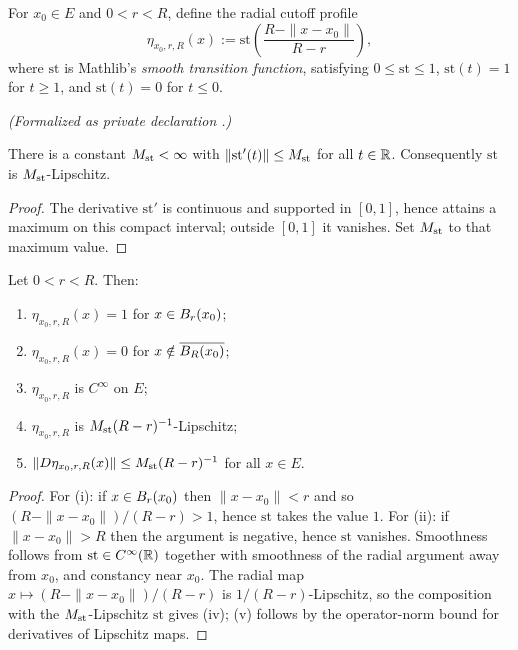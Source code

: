 \begin{definition}
\label{def:myCutoff}
\leanok
For $x_0 \in E$ and $0 < r < R$, define the radial cutoff profile
\begin{equation*}
\eta_{x_0,r,R}(x) := \mathrm{st}\!\left(\frac{R - \|x - x_0\|}{R - r}\right),
\end{equation*}
where $\mathrm{st}$ is Mathlib's \emph{smooth transition function}, satisfying
$0 \le \mathrm{st} \le 1$, $\mathrm{st}(t) = 1$ for $t \ge 1$, and
$\mathrm{st}(t) = 0$ for $t \le 0$.
\end{definition}

\begin{lemma}
\label{lem:smoothTransition_nnnorm_deriv_bounded}
\leanok
\noindent\textit{(Formalized as private declaration .)}\par
There is a constant $M_{\mathrm{st}} < \infty$ with $\|\mathrm{st}'(t)\| \le M_{\mathrm{st}}$ for
all $t \in \mathbb{R}$. Consequently $\mathrm{st}$ is $M_{\mathrm{st}}$-Lipschitz.
\end{lemma}

\begin{proof}
\leanok

The derivative $\mathrm{st}'$ is continuous and supported in $[0,1]$, hence
attains a maximum on this compact interval; outside $[0,1]$ it vanishes. Set
$M_{\mathrm{st}}$ to that maximum value.
\end{proof}

\begin{lemma}
\label{lem:cutoff-properties}
\leanok
{}
Let $0 < r < R$. Then:
\begin{enumerate}
\item $\eta_{x_0,r,R}(x) = 1$ for $x \in B_{r}(x_0)$;
\item $\eta_{x_0,r,R}(x) = 0$ for $x \notin \overline{B_{R}(x_0)}$;
\item $\eta_{x_0,r,R}$ is $C^\infty$ on $E$;
\item $\eta_{x_0,r,R}$ is $M_{\mathrm{st}} (R-r)^{-1}$-Lipschitz;
\item $\|D\eta_{x_0,r,R}(x)\| \le M_{\mathrm{st}} (R-r)^{-1}$ for all $x \in E$.
\end{enumerate}
\end{lemma}

\begin{proof}
\leanok

For (i): if $x \in B_{r}(x_0)$ then $\|x - x_0\| < r$ and so
$(R - \|x - x_0\|)/(R-r) > 1$, hence $\mathrm{st}$ takes the value $1$.
For (ii): if $\|x-x_0\| > R$ then the argument is negative, hence
$\mathrm{st}$ vanishes. Smoothness follows from
$\mathrm{st} \in C^\infty(\mathbb{R})$ together with smoothness of the radial
argument away from $x_0$, and constancy near $x_0$. The radial map
$x \mapsto (R - \|x-x_0\|)/(R-r)$ is $1/(R-r)$-Lipschitz, so the composition
with the $M_{\mathrm{st}}$-Lipschitz $\mathrm{st}$ gives (iv); (v) follows by the
operator-norm bound for derivatives of Lipschitz maps.
\end{proof}

